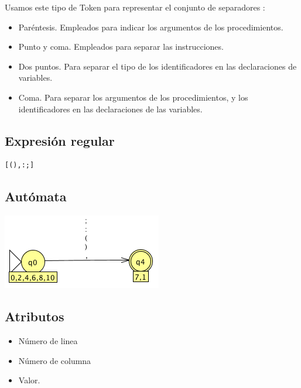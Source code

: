             Usamos este tipo de Token para representar el conjunto de separadores :
            
            \begin{itemize}
                \item Paréntesis. Empleados para indicar los argumentos de los procedimientos.
                \item Punto y coma. Empleados para separar las instrucciones.
                \item Dos puntos. Para separar el tipo de los identificadores en las declaraciones de variables.
                \item Coma. Para separar los argumentos de los procedimientos, y los identificadores en las declaraciones de las variables.
            \end{itemize}
            
        \subsection{Expresión regular}
            
             \begin{lstlisting}[language=Perl]
[(),:;]
             \end{lstlisting}


        \subsection{Autómata}
            
	        \includegraphics[scale=.7]{../Design/jflap/Separador.png}
	        
        \subsection{Atributos}
        
            \begin{itemize}
                \item Número de linea
                \item Número de columna
                \item Valor.
            \end{itemize}
            
